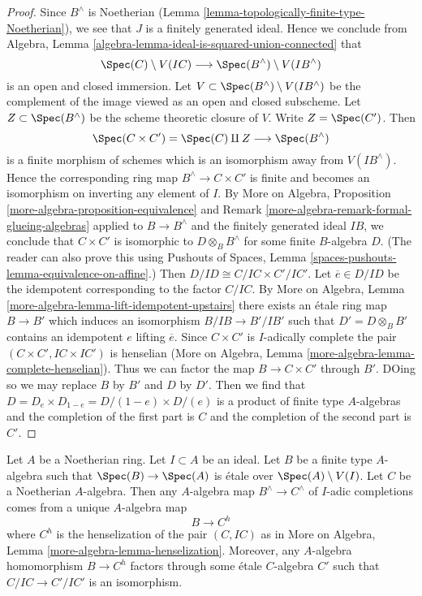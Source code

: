 \begin{proof}
Since $B^\wedge$ is Noetherian (Lemma
\ref{lemma-topologically-finite-type-Noetherian}),
we see that $J$ is a finitely generated
ideal. Hence we conclude from
Algebra, Lemma \ref{algebra-lemma-ideal-is-squared-union-connected}
that
$$
\Spec(C) \setminus V(IC) \longrightarrow \Spec(B^\wedge) \setminus V(IB^\wedge)
$$
is an open and closed immersion. Let
$V \subset \Spec(B^\wedge) \setminus V(IB^\wedge)$ be the complement
of the image viewed as an open and closed subscheme.
Let $Z \subset \Spec(B^\wedge)$ be the scheme
theoretic closure of $V$. Write $Z = \Spec(C')$. Then
$$
\Spec(C \times C') = \Spec(C) \amalg Z \longrightarrow \Spec(B^\wedge)
$$
is a finite morphism of schemes which is an isomorphism away from
$V(IB^\wedge)$. Hence the corresponding ring map $B^\wedge \to C \times C'$
is finite and becomes an isomorphism on inverting any element of $I$. By
More on Algebra, Proposition \ref{more-algebra-proposition-equivalence}
and Remark \ref{more-algebra-remark-formal-glueing-algebras}
applied to $B \to B^\wedge$ and the finitely generated ideal $IB$, we
conclude that $C \times C'$ is isomorphic to $D \otimes_B B^\wedge$
for some finite $B$-algebra $D$. (The reader can also prove this using
Pushouts of Spaces, Lemma \ref{spaces-pushouts-lemma-equivalence-on-affine}.)
Then $D/ID \cong C/IC \times C'/IC'$. Let $\overline{e} \in D/ID$
be the idempotent corresponding to the factor $C/IC$.
By More on Algebra, Lemma
\ref{more-algebra-lemma-lift-idempotent-upstairs} there exists an
\'etale ring map $B \to B'$ which induces an isomorphism
$B/IB \to B'/IB'$ such that $D' = D \otimes_B B'$ contains an
idempotent $e$ lifting $\overline{e}$. Since $C \times C'$
is $I$-adically complete the pair $(C \times C', IC \times IC')$
is henselian
(More on Algebra, Lemma \ref{more-algebra-lemma-complete-henselian}).
Thus we can factor the map $B \to C \times C'$ through $B'$.
DOing so we may replace $B$ by $B'$ and $D$ by $D'$. Then
we find that $D = D_e \times D_{1 - e} = D/(1 - e) \times D/(e)$
is a product of finite type $A$-algebras and the completion of the
first part is $C$ and the completion of the second part is $C'$.
\end{proof}

\begin{lemma}
\label{lemma-fully-faithful-etale-over-complement}
Let $A$ be a Noetherian ring. Let $I \subset A$ be an ideal.
Let $B$ be a finite type $A$-algebra such that
$\Spec(B) \to \Spec(A)$ is \'etale over $\Spec(A) \setminus V(I)$.
Let $C$ be a Noetherian $A$-algebra. Then any $A$-algebra
map $B^\wedge \to C^\wedge$ of $I$-adic completions
comes from a unique $A$-algebra map
$$
B \longrightarrow C^h
$$
where $C^h$ is the henselization of the pair $(C, IC)$ as
in More on Algebra, Lemma \ref{more-algebra-lemma-henselization}.
Moreover, any $A$-algebra homomorphism $B \to C^h$ factors through
some \'etale $C$-algebra $C'$ such that $C/IC \to C'/IC'$ is an isomorphism.
\end{lemma}

